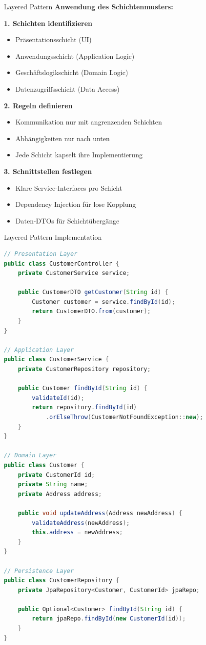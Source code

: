 \begin{KR}{Layered Pattern}
\textbf{Anwendung des Schichtenmusters:}

\textbf{1. Schichten identifizieren}
\begin{itemize}
    \item Präsentationsschicht (UI)
    \item Anwendungsschicht (Application Logic)
    \item Geschäftslogikschicht (Domain Logic)
    \item Datenzugriffsschicht (Data Access)
\end{itemize}

\textbf{2. Regeln definieren}
\begin{itemize}
    \item Kommunikation nur mit angrenzenden Schichten
    \item Abhängigkeiten nur nach unten
    \item Jede Schicht kapselt ihre Implementierung
\end{itemize}

\textbf{3. Schnittstellen festlegen}
\begin{itemize}
    \item Klare Service-Interfaces pro Schicht
    \item Dependency Injection für lose Kopplung
    \item Daten-DTOs für Schichtübergänge
\end{itemize}
\end{KR}

\begin{example2}{Layered Pattern Implementation}
\begin{lstlisting}[language=Java, style=basesmol]
// Presentation Layer
public class CustomerController {
    private CustomerService service;
    
    public CustomerDTO getCustomer(String id) {
        Customer customer = service.findById(id);
        return CustomerDTO.from(customer);
    }
}

// Application Layer
public class CustomerService {
    private CustomerRepository repository;
    
    public Customer findById(String id) {
        validateId(id);
        return repository.findById(id)
            .orElseThrow(CustomerNotFoundException::new);
    }
}

// Domain Layer
public class Customer {
    private CustomerId id;
    private String name;
    private Address address;
    
    public void updateAddress(Address newAddress) {
        validateAddress(newAddress);
        this.address = newAddress;
    }
}

// Persistence Layer
public class CustomerRepository {
    private JpaRepository<Customer, CustomerId> jpaRepo;
    
    public Optional<Customer> findById(String id) {
        return jpaRepo.findById(new CustomerId(id));
    }
}
\end{lstlisting}
\end{example2}

